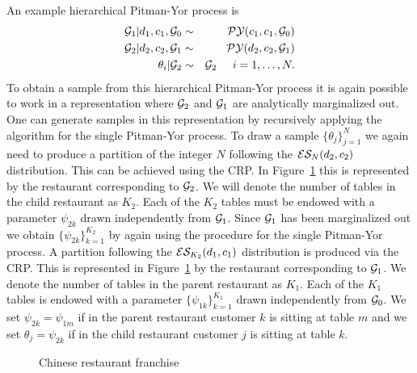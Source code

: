 An example hierarchical Pitman-Yor process is 
%
\begin{eqnarray*}
\G_1|d_1, c_1, \G_0 &\sim& \PY(c_1,c_1,\G_0)\\
\G_2 | d_2, c_2, \G_1 &\sim& \PY(d_2,c_2, \G_1)\\
\theta_i | \G_2 &\sim& \G_2 \hspace{.5cm} i = 1,\dots, N.
\end{eqnarray*}
%
To obtain a sample from this hierarchical Pitman-Yor process it is again possible to work in a representation where $\G_2$ and $\G_1$ are analytically marginalized out. One can generate samples in this representation by recursively applying the algorithm for the single Pitman-Yor process.  To draw a sample $\{ \theta_j \}_{j = 1}^N$ we again need to produce a partition of the integer $N$ following the $\ES_N(d_2,c_2)$ distribution.  This can be achieved using the CRP.  In Figure~\ref{figHPY} this is represented by the restaurant corresponding to $\G_2$. We will denote the number of tables in the child restaurant as $K_2$.  Each of the $K_2$ tables must be endowed with a parameter $ \psi_{2k}$ drawn independently from $\G_1$.  Since $\G_1$ has been marginalized out we obtain $\{ \psi_{2k} \}_ {k = 1}^{K_2}$ by again using the procedure for the single Pitman-Yor process.  A partition following the $\ES_{K_2}(d_1,c_1)$ distribution is produced via the CRP.  This is represented in Figure~\ref{figHPY} by the restaurant corresponding to $\G_1$. We denote the number of tables in the parent restaurant as $K_1$.   Each of the $K_1$ tables is endowed with a parameter $\{ \psi_{1k} \}_{ k = 1}^{K_1}$ drawn independently from $\G_0$.  We set $\psi_{2k}  = \psi_{1m}$ if in the parent restaurant customer $k$ is sitting at table $m$ and we set $\theta_j = \psi_{2k}$ if in the child restaurant customer $j$ is sitting at table $k$.
%
\begin{figure}[t] 
	\begin{center}
		\caption{Chinese restaurant franchise}
		\label{figHPY}
	\end{center} 
\end{figure} 
